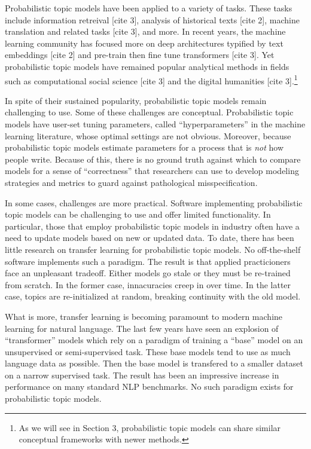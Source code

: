 \documentclass[conference,final,]{IEEEtran}
\begin{document}
Probabilistic topic models have been applied to a variety of tasks.
These tasks include information retreival {[}cite 3{]}, analysis of
historical texts {[}cite 2{]}, machine translation and related tasks
{[}cite 3{]}, and more. In recent years, the machine learning community
has focused more on deep architectures typified by text embeddings
{[}cite 2{]} and pre-train then fine tune transformers {[}cite 3{]}. Yet
probabilistic topic models have remained popular analytical methods in
fields such as computational social science {[}cite 3{]} and the digital
humanities {[}cite 3{]}.\footnote{As we will see in Section 3,
  probabilistic topic models can share similar conceptual frameworks
  with newer methods.}

In spite of their sustained popularity, probabilistic topic models
remain challenging to use. Some of these challenges are conceptual.
Probabilistic topic models have user-set tuning parameters, called
``hyperparameters'' in the machine learning literature, whose optimal
settings are not obvious. Moreover, because probabilistic topic models
estimate parameters for a process that is \emph{not} how people write.
Because of this, there is no ground truth against which to compare
models for a sense of ``correctness'' that researchers can use to
develop modeling strategies and metrics to guard against pathological
misspecification.

In some cases, challenges are more practical. Software implementing
probabilistic topic models can be challenging to use and offer limited
functionality. In particular, those that employ probabilistic topic
models in industry often have a need to update models based on new or
updated data. To date, there has been little research on transfer
learning for probabilistic topic models. No off-the-shelf software
implements such a paradigm. The result is that applied practicioners
face an unpleasant tradeoff. Either models go stale or they must be
re-trained from scratch. In the former case, innacuracies creep in over
time. In the latter case, topics are re-initialized at random, breaking
continuity with the old model.

What is more, transfer learning is becoming paramount to modern machine
learning for natural language. The last few years have seen an explosion
of ``transformer'' models which rely on a paradigm of training a
``base'' model on an unsupervised or semi-supervised task. These base
models tend to use as much language data as possible. Then the base
model is transfered to a smaller dataset on a narrow supervised task.
The result has been an impressive increase in performance on many
standard NLP benchmarks. No such paradigm exists for probabilistic topic
models.
\end{document}
